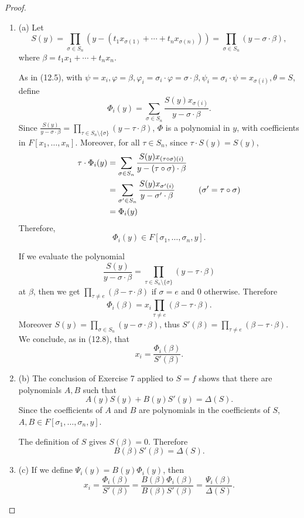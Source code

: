 \documentclass[11pt,a4paper]{article}
\newcommand{\be} {\begin{enumerate}}
\newcommand{\ee} {\end{enumerate}}
\begin{document}
\begin{proof}
\be
\item[(a)]
Let 
$$S(y) = \prod_{\sigma \in S_n} \left ( y - (t_1x_{\sigma(1)} + \cdots + t_n x_{\sigma(n)}) \right) = \prod_{\sigma \in S_n} ( y - \sigma \cdot \beta),$$
where $\beta = t_1 x_1+ \cdots + t_n x_n$.

As in (12.5), with $\psi = x_i, \varphi =  \beta,\varphi_i = \sigma_i \cdot \varphi = \sigma \cdot \beta, \psi_i = \sigma_i \cdot \psi = x_{\sigma(i)}, \theta = S$, define 
$$\Phi_i(y) = \sum_{\sigma \in S_n} \frac{S(y) x_{\sigma(i)}}{y - \sigma \cdot \beta}.$$
Since $\frac{S(y)}{y-\sigma \cdot \beta} = \prod\limits_{\tau \in S_n\setminus \{\sigma\}} (y - \tau \cdot \beta)$, $\Phi$ is a polynomial in $y$, with coefficients in $F[x_1,\ldots,x_n]$. Moreover, for all $\tau \in S_n$, since $\tau \cdot S(y) = S(y)$,
\begin{align*}
\tau \cdot \Phi_i(y) &= \sum_{\sigma \in S_n} \frac {S(y) x_{(\tau \circ \sigma)(i)}}{y - (\tau \circ \sigma) \cdot \beta}\\
&= \sum_{\sigma' \in S_n} \frac{S(y) x_{\sigma'(i)}}{y - \sigma' \cdot \beta}\hspace{1.cm} (\sigma' = \tau \circ \sigma)\\
&= \Phi_i(y)
\end{align*}
Therefore,
$$\Phi_i(y) \in F[\sigma_1,\ldots,\sigma_n,y].$$

If we evaluate the polynomial
$$\frac{S(y)}{y-\sigma \cdot \beta} = \prod\limits_{\tau \in S_n\setminus \{\sigma\}} (y - \tau \cdot \beta)$$
at $\beta$, then we get $\prod_{\tau \ne e} (\beta - \tau \cdot \beta)$ if $\sigma = e$ and $0$ otherwise. Therefore
$$\Phi_i(\beta) = x_i \prod_{\tau \ne e} (\beta - \tau\cdot \beta).$$
Moreover $S(y) = \prod_{\sigma \in S_n} ( y - \sigma \cdot \beta)$, thus $S'(\beta) = \prod_{\tau \ne e} (\beta - \tau\cdot \beta)$. We conclude, as in (12.8), that
$$x_i = \frac{\Phi_i(\beta)}{S'(\beta)}.$$

\item[(b)] The conclusion of Exercise 7 applied to $S = f$ shows that there are polynomials $A,B$ such that
$$A(y) S(y) + B(y) S'(y) = \Delta(S).$$
Since the coefficients of $A$ and $B$ are polynomials in the coefficients of $S$, $A,B \in F[\sigma_1,\ldots,\sigma_n,y]$.

The definition of $S$ gives $S(\beta) = 0$. Therefore
$$B(\beta) S'(\beta) = \Delta(S).$$

\item[(c)] If we define $\Psi_i(y) = B(y) \Phi_i(y)$, then $$x_i = \frac{\Phi_i(\beta)}{S'(\beta)} = \frac{B(\beta) \Phi_i(\beta)}{B(\beta) S'(\beta)}  = \frac{\Psi_i(\beta)}{\Delta(S)}. $$
\ee
\end{proof}
\end{document}
